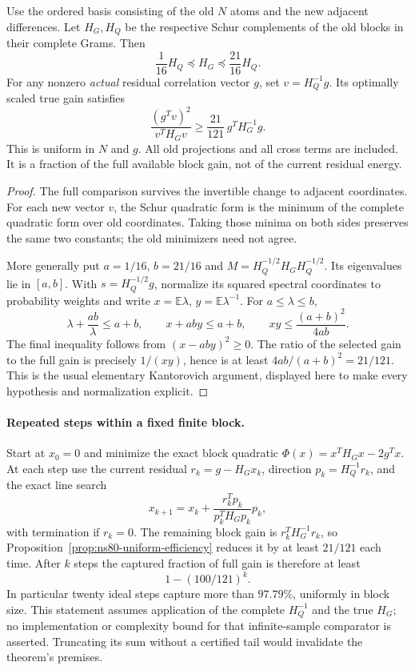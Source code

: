 \begin{proposition}
\label{prop:ns80-uniform-efficiency}
Use the ordered basis consisting of the old $N$ atoms and the new
adjacent differences. Let $H_G,H_Q$ be the respective Schur complements
of the old blocks in their complete Grams. Then
\[
 \frac1{16}H_Q\preceq H_G\preceq\frac{21}{16}H_Q.
\]
For any nonzero \emph{actual} residual correlation vector $g$, set
$v=H_Q^{-1}g$. Its optimally scaled true gain satisfies
\begin{equation}
 \frac{(g^Tv)^2}{v^TH_Gv}
 \geq\frac{21}{121}\,g^TH_G^{-1}g.
 \label{eq:ns80-gain-fraction}
\end{equation}
This is uniform in $N$ and $g$. All old projections and all cross terms
are included. It is a fraction of the full available block gain, not
of the current residual energy.
\end{proposition}
\begin{proof}
The full comparison survives the invertible change to adjacent
coordinates. For each new vector $v$, the Schur quadratic form is the
minimum of the complete quadratic form over old coordinates. Taking
those minima on both sides preserves the same two constants; the old
minimizers need not agree.

More generally put $a=1/16$, $b=21/16$ and
$M=H_Q^{-1/2}H_GH_Q^{-1/2}$. Its eigenvalues lie in $[a,b]$.
With $s=H_Q^{-1/2}g$, normalize its squared spectral coordinates to
probability weights and write $x=\mathbb E\lambda$,
$y=\mathbb E\lambda^{-1}$. For $a\leq\lambda\leq b$,
\[
 \lambda+\frac{ab}{\lambda}\leq a+b,
 \qquad x+aby\leq a+b,
 \qquad xy\leq\frac{(a+b)^2}{4ab}.
\]
The final inequality follows from $(x-aby)^2\geq0$.
The ratio of the selected gain to the full gain is precisely
$1/(xy)$, hence is at least $4ab/(a+b)^2=21/121$.
This is the usual elementary Kantorovich argument, displayed here
to make every hypothesis and normalization explicit.
\end{proof}

\paragraph{Repeated steps within a fixed finite block.}
Start at $x_0=0$ and minimize the exact block quadratic
$\Phi(x)=x^TH_Gx-2g^Tx$. At each step use the current residual
$r_k=g-H_Gx_k$, direction $p_k=H_Q^{-1}r_k$, and the exact line search
\[
 x_{k+1}=x_k+\frac{r_k^Tp_k}{p_k^TH_Gp_k}p_k,
\]
with termination if $r_k=0$. The remaining block gain is
$r_k^TH_G^{-1}r_k$, so Proposition~\ref{prop:ns80-uniform-efficiency}
reduces it by at least $21/121$ each time. After $k$ steps the captured
fraction of full gain is therefore at least
\[
 1-(100/121)^k.
\]
In particular twenty ideal steps capture more than $97.79\%$, uniformly
in block size. This statement assumes application of the complete
$H_Q^{-1}$ and the true $H_G$; no implementation or complexity bound for
that infinite-sample comparator is asserted. Truncating its sum without
a certified tail would invalidate the theorem's premises.

